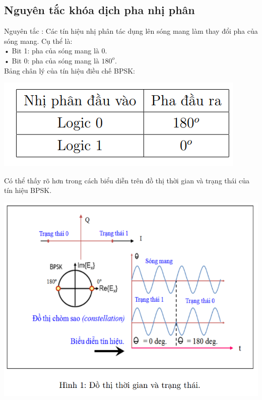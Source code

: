 \subsection{Nguyên tắc khóa dịch pha nhị phân}
Nguyên tắc : Các tín hiệu nhị phân tác dụng lên sóng mang làm thay đổi pha của
sóng mang. Cụ thể là: \\ 
• Bit 1: pha của sóng mang là 0. \\ 
• Bit 0: pha của sóng mang là $ 180^{o}.$\\  
Bảng chân lý của tín hiệu điều chế BPSK:
\begin{center}
     \includegraphics[scale=.5]{Img/bangchanlyPSK.png}
\end{center}
Có thể thấy rõ hơn trong cách biểu diễn trên đồ thị thời gian và trạng thái của tín
hiệu BPSK.
\begin{center}
     \includegraphics[scale=.7]{Img/bangtrangthai.png}
\end{center}
